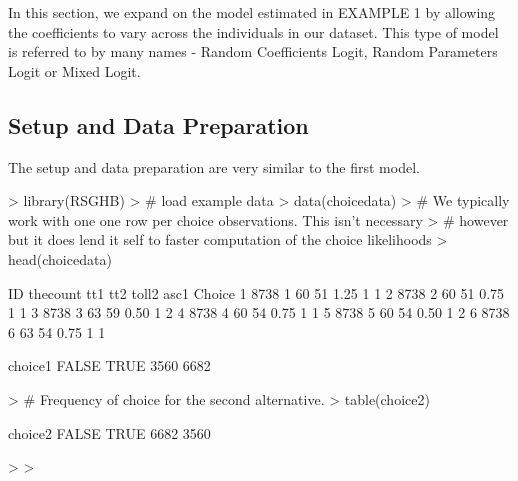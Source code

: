\documentclass{article}
\begin{document}
In this section, we expand on the model estimated in EXAMPLE 1 by allowing the coefficients to vary across the individuals in our dataset. This type of model is referred to by many names - Random Coefficients Logit, Random Parameters Logit or Mixed Logit. 

\subsection*{Setup and Data Preparation}

The setup and data preparation are very similar to the first model.

\begin{Schunk}
\begin{Sinput}
> library(RSGHB)
> # load example data
> data(choicedata)
> # We typically work with one one row per choice observations. This isn't necessary
> # however but it does lend it self to faster computation of the choice likelihoods
> head(choicedata)
\end{Sinput}
\begin{Soutput}
    ID thecount tt1 tt2 toll2 asc1 Choice
1 8738        1  60  51  1.25    1      1
2 8738        2  60  51  0.75    1      1
3 8738        3  63  59  0.50    1      2
4 8738        4  60  54  0.75    1      1
5 8738        5  60  54  0.50    1      2
6 8738        6  63  54  0.75    1      1
\end{Soutput}
\begin{Soutput}
choice1
FALSE  TRUE 
 3560  6682 
\end{Soutput}
\begin{Sinput}
> # Frequency of choice for the second alternative.
> table(choice2)
\end{Sinput}
\begin{Soutput}
choice2
FALSE  TRUE 
 6682  3560 
\end{Soutput}
\begin{Sinput}
> 
> 
\end{Sinput}
\end{Schunk}
\end{document}
